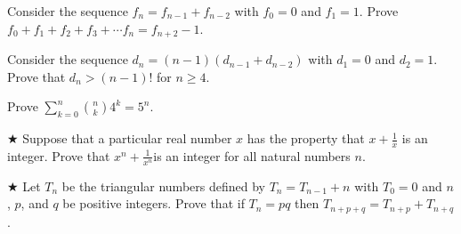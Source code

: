 %

\begin{proofp}
Consider the sequence $f_n=f_{n-1}+f_{n-2}$ with $f_0=0$ and $f_1=1$.  Prove $f_0+f_1+f_2+f_3 +\cdots f_n=f_{n+2}-1$.
\end{proofp}






\begin{proofp}
Consider the sequence $d_n=(n-1)(d_{n-1}+d_{n-2})$ with $d_1=0$ and $d_2=1$.  Prove that $d_n>(n-1)!$ for $n\ge 4$.
\end{proofp}

\begin{proofp}
Prove $\sum_{k=0}^n \binom{n}{k}4^k=5^n$.
\end{proofp}


\begin{proofp}$\bigstar$
Suppose that a particular real number $x$ has the property that $x+\frac{1}{x}$ is an integer. Prove that $x^n+\frac{1}{x^n}$is an integer for all natural numbers $n$.
\end{proofp}

\begin{proofp}$\bigstar$
Let $T_n$ be the triangular numbers defined by $T_n=T_{n-1}+n$ with $T_0=0$ and $n$, $p$, and $q$ be positive integers.  Prove that if $T_n=pq$ then $T_{n+p+q}=T_{n+p}+T_{n+q}$.
\end{proofp}


